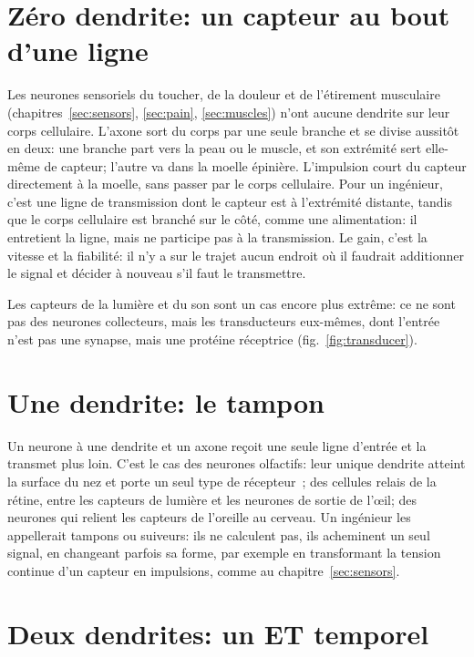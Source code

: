 \section{Zéro dendrite: un capteur au bout d'une ligne}

Les neurones sensoriels du toucher, de la douleur et de l'étirement musculaire (chapitres~\ref{sec:sensors}, \ref{sec:pain}, \ref{sec:muscles}) n'ont aucune dendrite sur leur corps cellulaire. L'axone sort du corps par une seule branche et se divise aussitôt en deux: une branche part vers la peau ou le muscle, et son extrémité sert elle-même de capteur; l'autre va dans la moelle épinière. L'impulsion court du capteur directement à la moelle, sans passer par le corps cellulaire. Pour un ingénieur, c'est une ligne de transmission dont le capteur est à l'extrémité distante, tandis que le corps cellulaire est branché sur le côté, comme une alimentation: il entretient la ligne, mais ne participe pas à la transmission. Le gain, c'est la vitesse et la fiabilité: il n'y a sur le trajet aucun endroit où il faudrait additionner le signal et décider à nouveau s'il faut le transmettre.

Les capteurs de la lumière et du son sont un cas encore plus extrême: ce ne sont pas des neurones collecteurs, mais les transducteurs eux-mêmes, dont l'entrée n'est pas une synapse, mais une protéine réceptrice (fig.~\ref{fig:transducer}).

\section{Une dendrite: le tampon}

Un neurone à une dendrite et un axone reçoit une seule ligne d'entrée et la transmet plus loin. C'est le cas des neurones olfactifs: leur unique dendrite atteint la surface du nez et porte un seul type de récepteur~\cite{Mombaerts2004}; des cellules relais de la rétine, entre les capteurs de lumière et les neurones de sortie de l'œil; des neurones qui relient les capteurs de l'oreille au cerveau. Un ingénieur les appellerait tampons ou suiveurs: ils ne calculent pas, ils acheminent un seul signal, en changeant parfois sa forme, par exemple en transformant la tension continue d'un capteur en impulsions, comme au chapitre~\ref{sec:sensors}.

\section{Deux dendrites: un ET temporel}

